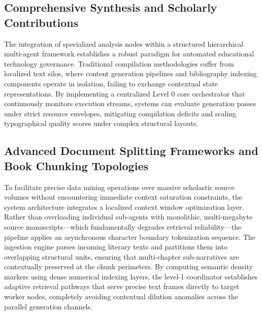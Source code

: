 \subsection{Comprehensive Synthesis and Scholarly Contributions}
The integration of specialized analysis nodes within a structured hierarchical multi-agent framework establishes a robust paradigm for automated educational technology governance. Traditional compilation methodologies suffer from localized text silos, where content generation pipelines and bibliography indexing components operate in isolation, failing to exchange contextual state representations. By implementing a centralized Level 0 core orchestrator that continuously monitors execution streams, systems can evaluate generation passes under strict resource envelopes, mitigating compilation deficits and scaling typographical quality scores under complex structural layouts.

\subsection{Advanced Document Splitting Frameworks and Book Chunking Topologies}
To facilitate precise data mining operations over massive scholastic source volumes without encountering immediate context saturation constraints, the system architecture integrates a localized context window optimization layer. Rather than overloading individual sub-agents with monolithic, multi-megabyte source manuscripts—which fundamentally degrades retrieval reliability—the pipeline applies an asynchronous character boundary tokenization sequence. The ingestion engine parses incoming literary texts and partitions them into overlapping structural units, ensuring that multi-chapter sub-narratives are contextually preserved at the chunk perimeters. By computing semantic density markers using dense numerical indexing layers, the level-1 coordinator establishes adaptive retrieval pathways that serve precise text frames directly to target worker nodes, completely avoiding contextual dilution anomalies across the parallel generation channels.


